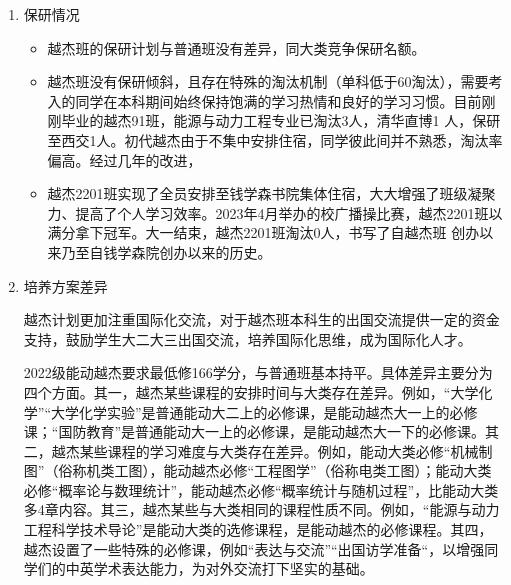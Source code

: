 \documentclass[zihao=-4,fontset=none]{Beautybook-CN}
\begin{document}
\begin{enumerate}
	      \begin{enumerate}
	      	\item 保研情况
	      	      	      	      	      	      
	      	      \begin{itemize}
	      	      	\item 越杰班的保研计划与普通班没有差异，同大类竞争保研名额。
	      	      	      
	      	      	\item 越杰班没有保研倾斜，且存在特殊的淘汰机制（单科低于60淘汰），需要考入的同学在本科期间始终保持饱满的学习热情和良好的学习习惯。目前刚刚毕业的越杰91班，能源与动力工程专业已淘汰3人，清华直博1  人，保研至西交1人。初代越杰由于不集中安排住宿，同学彼此间并不熟悉，淘汰率偏高。经过几年的改进，
	      	      	      
	      	      	\item 越杰2201班实现了全员安排至钱学森书院集体住宿，大大增强了班级凝聚力、提高了个人学习效率。2023年4月举办的校广播操比赛，越杰2201班以满分拿下冠军。大一结束，越杰2201班淘汰0人，书写了自越杰班 创办以来乃至自钱学森院创办以来的历史。
	      	      \end{itemize}
	      	      	      	      	      	      
	      	\item 培养方案差异
	      	      	      	      	      	      
	      	      越杰计划更加注重国际化交流，对于越杰班本科生的出国交流提供一定的资金支持，鼓励学生大二大三出国交流，培养国际化思维，成为国际化人才。
	      	      
	      	      2022级能动越杰要求最低修166学分，与普通班基本持平。具体差异主要分为四个方面。其一，越杰某些课程的安排时间与大类存在差异。例如，“大学化学”“大学化学实验”是普通能动大二上的必修课，是能动越杰大一上的必修课；“国防教育”是普通能动大一上的必修课，是能动越杰大一下的必修课。其二，越杰某些课程的学习难度与大类存在差异。例如，能动大类必修“机械制图”（俗称机类工图），能动越杰必修“工程图学”（俗称电类工图）；能动大类必修“概率论与数理统计”，能动越杰必修“概率统计与随机过程”，比能动大类多4章内容。其三，越杰某些与大类相同的课程性质不同。例如，“能源与动力工程科学技术导论”是能动大类的选修课程，是能动越杰的必修课程。其四，越杰设置了一些特殊的必修课，例如“表达与交流”“出国访学准备“，以增强同学们的中英学术表达能力，为对外交流打下坚实的基础。
	      \end{enumerate}
\end{enumerate}
\end{document}
